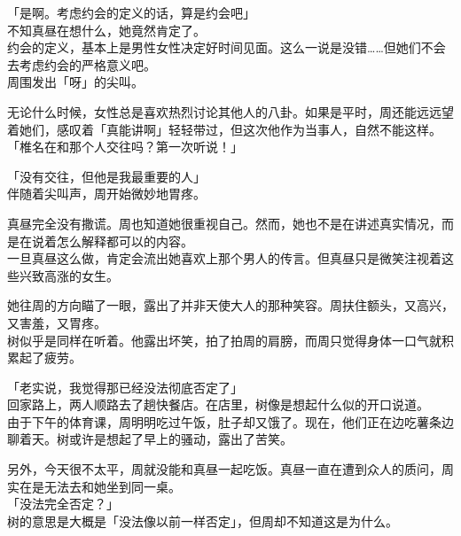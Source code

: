 「是啊。考虑约会的定义的话，算是约会吧」\\

不知真昼在想什么，她竟然肯定了。\\

约会的定义，基本上是男性女性决定好时间见面。这么一说是没错……但她们不会去考虑约会的严格意义吧。\\

周围发出「呀」的尖叫。

无论什么时候，女性总是喜欢热烈讨论其他人的八卦。如果是平时，周还能远远望着她们，感叹着「真能讲啊」轻轻带过，但这次他作为当事人，自然不能这样。\\

「椎名在和那个人交往吗？第一次听说！」

「没有交往，但他是我最重要的人」\\

伴随着尖叫声，周开始微妙地胃疼。

真昼完全没有撒谎。周也知道她很重视自己。然而，她也不是在讲述真实情况，而是在说着怎么解释都可以的内容。\\

一旦真昼这么做，肯定会流出她喜欢上那个男人的传言。但真昼只是微笑注视着这些兴致高涨的女生。

她往周的方向瞄了一眼，露出了并非天使大人的那种笑容。周扶住额头，又高兴，又害羞，又胃疼。\\

树似乎是同样在听着。他露出坏笑，拍了拍周的肩膀，而周只觉得身体一口气就积累起了疲劳。\\

\vspace{2\baselineskip}

「老实说，我觉得那已经没法彻底否定了」\\

回家路上，两人顺路去了趟快餐店。在店里，树像是想起什么似的开口说道。\\

由于下午的体育课，周明明吃过午饭，肚子却又饿了。现在，他们正在边吃薯条边聊着天。树或许是想起了早上的骚动，露出了苦笑。

另外，今天很不太平，周就没能和真昼一起吃饭。真昼一直在遭到众人的质问，周实在是无法去和她坐到同一桌。\\

「没法完全否定？」\\

树的意思是大概是「没法像以前一样否定」，但周却不知道这是为什么。\\

